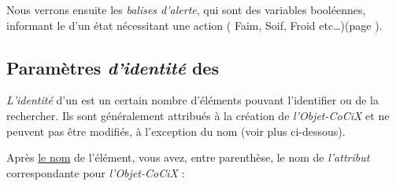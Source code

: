 \documentclass[french]{report}
\begin{document}
Nous verrons ensuite les \textit{balises d'alerte}, qui sont des variables booléennes, informant  le \CoCiX d'un état nécessitant une action ( Faim, Soif, Froid etc\dots)(page \pageref{balise}).

\newpage

\subsection{Paramètres \textit{d'identité} des \CoCiX}\label{identite}

\textit{L'identité} d'un \CoCiX est un certain nombre d'éléments pouvant l'identifier ou de la rechercher. Ils sont généralement attribués à la création de \textit{l'Objet-CoCiX} et ne peuvent pas être modifiés, à l'exception du nom (voir plus ci-dessous).\par

Après \underline{le nom} de l'élément, vous avez, entre parenthèse, le nom de \textit{l'attribut} correspondante pour \textit{l'Objet-CoCiX} :\\
\end{document}
